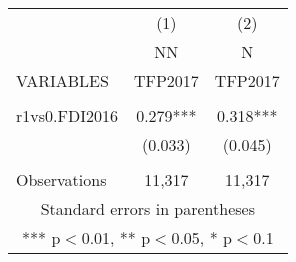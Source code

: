 \documentclass[]{article}
\begin{document}
\begin{tabular}{lcc} \hline
 & (1) & (2) \\
 & NN & N \\
VARIABLES & TFP2017 & TFP2017 \\ \hline
 &  &  \\
r1vs0.FDI2016 & 0.279*** & 0.318*** \\
 & (0.033) & (0.045) \\
 &  &  \\
 Observations & 11,317 & 11,317 \\ \hline
\multicolumn{3}{c}{ Standard errors in parentheses} \\
\multicolumn{3}{c}{ *** p$<$0.01, ** p$<$0.05, * p$<$0.1} \\
\end{tabular}
\end{document}
